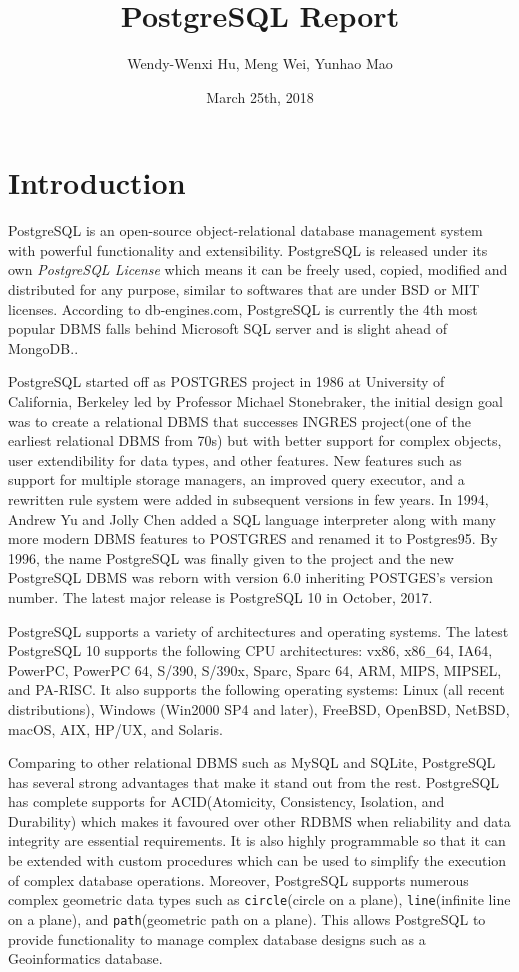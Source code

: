 \documentclass[a4paper]{article}
\title{PostgreSQL Report}
\author{Wendy-Wenxi Hu, Meng Wei, Yunhao Mao}
\date{March 25th, 2018}
\begin{document}
\maketitle


\section{Introduction}
PostgreSQL is an open-source object-relational database management system with powerful functionality and extensibility\cite{1}. PostgreSQL is released under its own \textit{PostgreSQL License} which means it can be freely used, copied, modified and distributed for any purpose, similar to softwares that are under BSD or MIT licenses\cite{2}. According to db-engines.com, PostgreSQL is currently the 4th most popular DBMS falls behind Microsoft SQL server and is slight ahead of MongoDB.\cite{3}.

PostgreSQL started off as POSTGRES project in 1986 at University of California, Berkeley led by Professor Michael Stonebraker, the initial design goal was to create a relational DBMS that successes INGRES project(one of the earliest relational DBMS from 70s) but with better support for complex objects, user extendibility for data types, and other features\cite{4}. New features such as support for multiple storage managers, an improved query executor, and a rewritten rule system were added in subsequent versions in few years. In 1994, Andrew Yu and Jolly Chen added a SQL language interpreter along with many more modern DBMS features to POSTGRES and renamed it to Postgres95. By 1996, the name PostgreSQL was finally given to the project and the new PostgreSQL DBMS was reborn with version 6.0 inheriting POSTGES's version number\cite{1}. The latest major release is PostgreSQL 10 in October, 2017. 

PostgreSQL supports a variety of architectures and operating systems. The latest PostgreSQL 10 supports the following CPU architectures: vx86, x86\_64, IA64, PowerPC, PowerPC 64, S/390, S/390x, Sparc, Sparc 64, ARM, MIPS, MIPSEL, and PA-RISC. It also supports the following operating systems: Linux (all recent distributions), Windows (Win2000 SP4 and later), FreeBSD, OpenBSD, NetBSD, macOS, AIX, HP/UX, and Solaris\cite{1}.

Comparing to other relational DBMS such as MySQL and SQLite, PostgreSQL has several strong advantages that make it stand out from the rest. PostgreSQL has complete supports for ACID(Atomicity, Consistency, Isolation, and Durability) which makes it favoured over other RDBMS when reliability and data integrity are essential requirements. It is also highly programmable so that it can be extended with custom procedures which can be used to simplify the execution of complex database operations. Moreover, PostgreSQL supports numerous complex geometric data types such as \texttt{circle}(circle on a plane), \texttt{line}(infinite line on a plane), and \texttt{path}(geometric path on a plane)\cite{7}. This allows PostgreSQL to provide functionality to manage complex database designs such as a Geoinformatics database.
\end{document}

